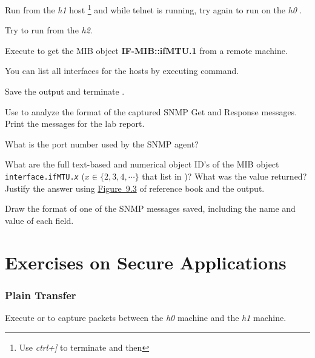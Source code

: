 \documentclass{../UTNetLab}
\begin{document}
Run from the \textit{h1} host  \footnote{Use \textit{ctrl+]} to terminate  and then } and while telnet is running, try again to run on the \textit{h0}  .

Try to run  from the \textit{h2}.

Execute  to get the MIB object \textbf{IF-MIB::ifMTU.1} from a remote machine.

You can list all interfaces for the hosts by executing  command.

Save the  output and terminate .

Use  to analyze the format of the captured SNMP Get and Response messages.
Print the messages for the lab report.

\begin{report}
    \item What is the port number used by the SNMP agent?

    \item What are the full text-based and numerical object ID’s of the MIB object \texttt{interface.ifMTU.\textit{x}} ($x \in \{2,3,4,\cdots\}$ that list in )? What was the value returned? Justify the answer using \hyperref[fig:9.3]{Figure~9.3} of reference book and the  output.

    \item Draw the format of one of the SNMP messages saved, including the name and value of each field.
\end{report}

\part{Exercises on Secure Applications}

\section{Plain Transfer}
Execute  or  to capture packets between the \textit{h0} machine and the \textit{h1} machine.
\end{document}

